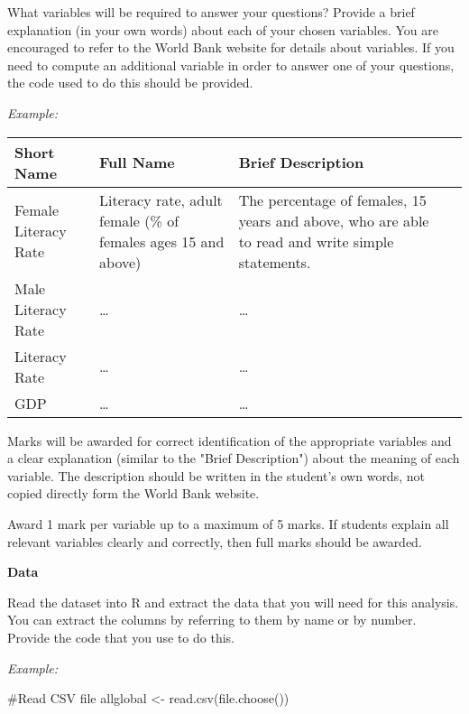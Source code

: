 \documentclass[11pt]{exam}
\newenvironment{codeChunk}{}{}
\begin{document}
\begin{questions}
What variables will be required to answer your questions?  Provide a
brief explanation (in your own words) about each of your chosen
variables. You are encouraged to refer to the World Bank website for
details about variables.  If you need to compute an additional
variable in order to answer one of your questions, the code used to do
this should be provided.

{\it Example: \\
%
\begin{tabular}{llll}
Short Name & Full Name  & Brief Description \\\hline

Female Literacy Rate &\parbox[t]{4cm}{Literacy rate, adult female (\% of females ages 15 and above)} & \parbox[t]{7cm}{The percentage of females, 15 years and above, who are able to read and write simple statements.}\\
Male Literacy Rate  & \ldots  &\ldots  \\
Literacy Rate  & \ldots   &\ldots  \\
GDP & \ldots  & \ldots  \\
\end{tabular}
}


\begin{solution}[5mm]
Marks will be awarded for correct identification of the appropriate variables and a clear explanation (similar to the "Brief Description") about the meaning of each variable.  The description should be written in the student's own words, not copied directly form the World Bank website.

Award 1 mark per variable up to a maximum of 5 marks. If students explain all relevant variables clearly and correctly, then full marks should be awarded.

\end{solution}


\question[5] \textbf{Data}  \droptotalpoints

Read the dataset into R and extract the data that you will need for
this analysis.  You can extract the columns by referring to them by
name or by number.  Provide the code that you use to do this.

\textit{Example:}
\begin{codeChunk}
\begin{codeIn}
#Read CSV file
allglobal <- read.csv(file.choose())


\end{codeIn}
\end{codeChunk}
\end{questions}
\end{document}
